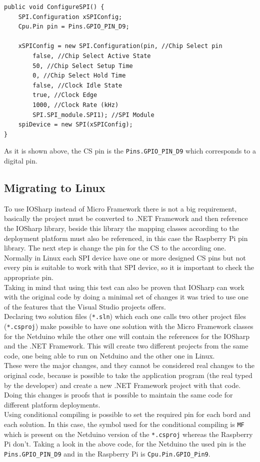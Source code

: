 \begin{lstlisting}[language=CSharp, caption={SPIApi.cs - Configuring SPI for the MFRC522 in Netduino Plus}]
public void ConfigureSPI() {
    SPI.Configuration xSPIConfig;
    Cpu.Pin pin = Pins.GPIO_PIN_D9;

    xSPIConfig = new SPI.Configuration(pin, //Chip Select pin
        false, //Chip Select Active State
        50, //Chip Select Setup Time
        0, //Chip Select Hold Time
        false, //Clock Idle State
        true, //Clock Edge
        1000, //Clock Rate (kHz)
        SPI.SPI_module.SPI1); //SPI Module
    spiDevice = new SPI(xSPIConfig);
}
\end{lstlisting}
As it is shown above, the \gls{CS} pin is the \verb!Pins.GPIO_PIN_D9! which corresponds to a digital pin.

\subsection{Migrating to Linux}\label{S:IOEx-SPI-Migrating-to-IOSharp}
To use IOSharp instead of Micro Framework there is not a big requirement, basically the project must be converted to .NET Framework and then reference the IOSharp library, beside this library the mapping classes according to the deployment platform must also be referenced, in this case the Raspberry Pi pin library. The next step is change the pin for the \gls{CS} to the according one. Normally in Linux each SPI device have one or more designed \gls{CS} pins but not every pin is suitable to work with that SPI device, so it is important to check the appropriate pin.
\\
Taking in mind that using this test can also be proven that IOSharp can work with the original code by doing a minimal set of changes it was tried to use one of the features that the Visual Studio projects offers.
\\
Declaring two solution files (\verb!*.sln!) which each one calls two other project files (\verb!*.csproj!) make possible to have one solution with the Micro Framework classes for the Netduino while the other one will contain the references for the IOSharp and the .NET Framework. This will create two different projects from the same code, one being able to run on Netduino and the other one in Linux.
\\
These were the major changes, and they cannot be considered real changes to the original code, because is possible to take the application program (the real typed by the developer) and create a new .NET Framework project with that code. Doing this changes is proofs that is possible to maintain the same code for different platform deployments.
\\
Using conditional compiling is possible to set the required pin for each bord and each solution. In this case, the symbol used for the conditional compiling is \verb!MF! which is present on the Netduino version of the \verb!*.csproj! whereas the Raspberry Pi don't. Taking a look in the above code, for the Netduino the used pin is the \verb!Pins.GPIO_PIN_D9! and in the Raspberry Pi is \verb!Cpu.Pin.GPIO_Pin9!.


